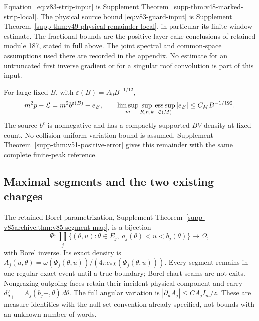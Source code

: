 Equation~\eqref{eq:v83-strip-input} is Supplement
Theorem~\ref{supp-thm:v48-marked-strip-local}. The physical source
bound \eqref{eq:v83-guard-input} is Supplement
Theorem~\ref{supp-thm:v49-physical-remainder-local}, in particular its
finite-window estimate. The fractional bounds are the positive
layer-cake conclusions of retained module 187, stated in full above.
The joint spectral and common-space assumptions used there are recorded
in the appendix. No estimate for an untruncated first inverse gradient
or for a singular roof convolution is part of this input.

\begin{inputstatement}
\label{input:v83-scalar}
For large fixed $B$, with $\varepsilon(B)=A_0B^{-1/12}$,
\begin{equation}\label{eq:v76-remainder}
 m^2p-\mathcal L=m^2b^{\varepsilon(B)}+e_B,\qquad
 \limsup_m\sup_{R,n,k}\esssup_{\mathcal C(M)}|e_B|
                                      \le C_MB^{-1/192}.
\end{equation}
The source $b^\varepsilon$ is nonnegative and has a compactly supported
$BV$ density at fixed count. No collision-uniform variation bound is
assumed. Supplement Theorem~\ref{supp-thm:v51-positive-error} gives
this remainder with the same complete finite-peak reference.
\end{inputstatement}

\subsection{Maximal segments and the two existing charges}
The retained Borel parametrization, Supplement
Theorem~\ref{supp-v85archive:thm:v85-segment-map}, is a bijection
\[
 \Psi:\coprod_j\{(\theta,u):\theta\in E_j,\ a_j(\theta)<u<b_j(\theta)\}
                      \longrightarrow\Omega,
\]
with Borel inverse. Its exact density is
$A_j(u,\theta)=\omega(\Psi_j(\theta,u))/(4\pi c_*\chi(\Psi_j(\theta,u)))$.
Every segment remains in one regular exact event until a true boundary;
Borel chart seams are not exits. Nongrazing outgoing faces retain their
incident physical component and carry
$d\zeta_+=A_j(b_j-,\theta)\,d\theta$. The full angular variation is
$|\partial_u A_j|\le C A_j I_m/z$.
These are measure identities with the null-set convention already
specified, not bounds with an unknown number of words.

